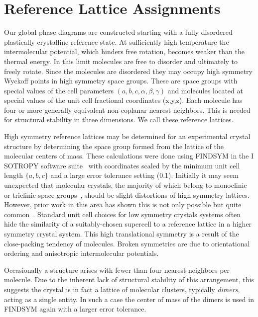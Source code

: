 \documentclass[preprint]{iucr}              %
\begin{document}
\section{Reference Lattice Assignments}
\label{assignments}

Our global phase diagrams are constructed starting with a fully
disordered plastically crystalline reference state.  At sufficiently
high temperature the intermolecular potential, which hinders free
rotation, becomes weaker than the thermal energy.  In this limit
molecules are free to disorder and ultimately to freely rotate.
Since the molecules are disordered they may occupy high symmetry
Wyckoff points in high symmetry space groups. These are space groups
with special values of the cell parameters
$(a,b,c,\alpha,\beta,\gamma)$ and molecules located at special
values of the unit cell fractional coordinates (x,y,z). Each
molecule has four or more generally equivalent non-coplanar nearest
neighbors. This is needed for structural stability in three
dimensions. We call these reference lattices.

High symmetry reference lattices may be determined for an
experimental crystal structure by determining the space group formed
from the lattice of the molecular centers of mass. These
calculations were done using F{\small INDSYM} in the I{\small
SOTROPY} software suite~\cite{Stokes02b} with coordinates scaled by
the minimum unit cell length $\{a,b,c\}$ and a large error tolerance
setting (0.1). Initially it may seem unexpected that molecular
crystals, the majority of which belong to monoclinic or triclinic
space groups~\cite{Bassoul00}, should be slight distortions of high
symmetry lattices. However, prior work in this area has shown this
is not only possible but quite
common~\cite{Motherwell97,Reichling00}. Standard unit cell choices
for low symmetry crystals systems often hide the similarity of a
suitably-chosen supercell to a reference lattice in a higher
symmetry crystal system. This high translational symmetry is a
result of the close-packing tendency of molecules. Broken symmetries
are due to orientational ordering and anisotropic intermolecular
potentials.

Occasionally a structure arises with fewer than four nearest
neighbors per molecule.  Due to the inherent lack of structural
stability of this arrangement, this suggests the crystal is in fact
a lattice of molecular clusters, typically \emph{dimers}, acting as
a single entity.  In such a case the center of mass of the dimers is
used in F{\small INDSYM} again with a larger error tolerance.
\end{document}
